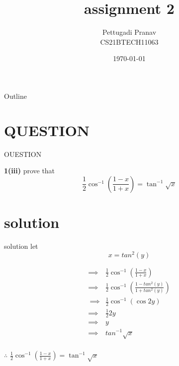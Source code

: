\documentclass{beamer}
\title{assignment 2}
\author{Pettugadi Pranav\\CS21BTECH11063}
\date{\today}
\providecommand{\brak}[1]{\ensuremath{\left(#1\right)}}
\begin{document}
\begin{frame}
    \titlepage 
\end{frame}

\logo{}


\begin{frame}{Outline}
    \tableofcontents
\end{frame}


\section{QUESTION}
\begin{frame}{OUESTION}
\begin{block}{\textbf{1(iii)}}
        prove that $$\frac{1}{2}\cos^{-1}\brak{\frac{1-x}{1+x}} = \tan^{-1}{\sqrt{x}}$$
    \end{block}

\end{frame}
\section{solution}
\begin{frame}{solution}
let$$ x= tan^2(y)$$

\begin{align*}
\implies&\frac{1}{2}\cos^{-1}\brak{\frac{1-x}{1+x}}\\
\implies&\frac{1}{2}\cos^{-1}\brak{\frac{1-tan^2(y)}{1+tan^2(y)}}\\\
\implies&\frac{1}{2}\cos^{-1}({\cos{2y}})\\
\implies&\frac{1}{2} 2y\\
\implies&y\\
\implies&tan^{-1}\sqrt{x}\\
\end{align*}

$\therefore$ $\frac{1}{2}\cos^{-1}\brak{\frac{1-x}{1+x}} = \tan^{-1}{\sqrt{x}}$


\end{frame} 
\end{document}
